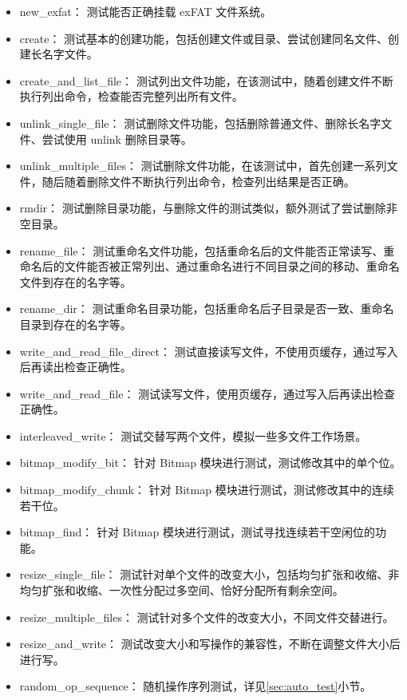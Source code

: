 \begin{itemize}
    \item new\_exfat： 测试能否正确挂载 exFAT 文件系统。 
    \item create： 测试基本的创建功能，包括创建文件或目录、尝试创建同名文件、创建长名字文件。 
    \item create\_and\_list\_file： 测试列出文件功能，在该测试中，随着创建文件不断执行列出命令，检查能否完整列出所有文件。 
    \item unlink\_single\_file： 测试删除文件功能，包括删除普通文件、删除长名字文件、尝试使用 unlink 删除目录等。 
    \item unlink\_multiple\_files： 测试删除文件功能，在该测试中，首先创建一系列文件，随后随着删除文件不断执行列出命令，检查列出结果是否正确。 
    \item rmdir： 测试删除目录功能，与删除文件的测试类似，额外测试了尝试删除非空目录。 
    \item rename\_file： 测试重命名文件功能，包括重命名后的文件能否正常读写、重命名后的文件能否被正常列出、通过重命名进行不同目录之间的移动、重命名文件到存在的名字等。 
    \item rename\_dir： 测试重命名目录功能，包括重命名后子目录是否一致、重命名目录到存在的名字等。 
    \item write\_and\_read\_file\_direct： 测试直接读写文件，不使用页缓存，通过写入后再读出检查正确性。 
    \item write\_and\_read\_file： 测试读写文件，使用页缓存，通过写入后再读出检查正确性。 
    \item interleaved\_write： 测试交替写两个文件，模拟一些多文件工作场景。 
    \item bitmap\_modify\_bit： 针对 Bitmap 模块进行测试，测试修改其中的单个位。 
    \item bitmap\_modify\_chunk： 针对 Bitmap 模块进行测试，测试修改其中的连续若干位。 
    \item bitmap\_find： 针对 Bitmap 模块进行测试，测试寻找连续若干空闲位的功能。 
    \item resize\_single\_file： 测试针对单个文件的改变大小，包括均匀扩张和收缩、非均匀扩张和收缩、一次性分配过多空间、恰好分配所有剩余空间。 
    \item resize\_multiple\_files： 测试针对多个文件的改变大小，不同文件交替进行。 
    \item resize\_and\_write： 测试改变大小和写操作的兼容性，不断在调整文件大小后进行写。 
    \item random\_op\_sequence： 随机操作序列测试，详见\ref{sec:auto_test}小节。 
\end{itemize}

